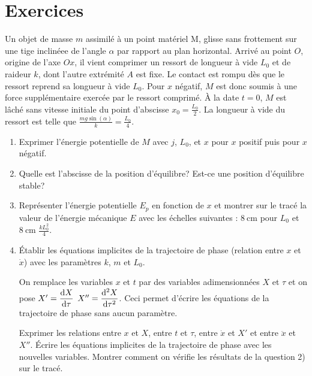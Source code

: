 \section{Exercices}%
\label{chap5-sec:exercices}%
\begin{exercice}%
  Un objet de masse \(m\) assimilé à un point matériel M, glisse sans 
  frottement sur une tige inclinéee de l'angle \(\alpha\) par rapport au plan 
  horizontal.
  Arrivé au point \(O\), origine de l'axe \(Ox\), il vient comprimer un ressort 
  de longueur à vide \(L_0\) et de raideur \(k\), dont l'autre extrémité \(A\) 
  est fixe. Le contact est rompu dès que le ressort reprend sa longueur à vide 
  \(L_0\). Pour \(x\) négatif, \(M\) est donc soumis à une force supplémentaire 
  exercée par le ressort comprimé.
  À la date \(t=0\), \(M\) est lâché sans vitesse initiale du point d'abscisse 
  \(x_0=\frac{L_0}{2}\). La longueur à vide du ressort est telle que \(\frac{mg 
  \sin(\alpha)}{k} = \frac{L_0}{4}\).
  \begin{enumerate}
    \item Exprimer l'énergie potentielle de \(M\) avec \(j\), \(L_0\), et \(x\) 
      pour \(x\) positif puis pour \(x\) négatif.
    \item Quelle est l'abscisse de la position d'équilibre? Est-ce une 
      position d'équilibre stable?
    \item Représenter l'énergie potentielle \(E_p\) en fonction de \(x\) et 
      montrer sur le tracé la valeur de l'énergie mécanique \(E\) avec les 
      échelles suivantes : \(\SI{8}{\centi\meter}\) pour \(L_0\) et 
      \(\SI{8}{\centi\meter}\) \(\frac{k L_0^2}{4}\).
    \item Établir les équations implicites de la trajectoire de phase (relation 
      entre \(x\) et \(\dot{x}\)) avec les paramètres \(k\), \(m\) et \(L_0\).

    On remplace les variables \(x\) et \(t\) par des variables adimensionnées 
      \(X\) et \(\tau\) et on pose \(X' = \dfrac{\mathrm{d} X}{\mathrm{d} \tau}\) \(X'' = 
      \dfrac{\mathrm{d}^2 X}{\mathrm{d} {\tau}^2}\). Ceci permet d'écrire les équations de la 
      trajectoire de phase sans aucun paramètre.

    Exprimer les relations entre \(x\) et \(X\), entre \(t\) et \(\tau\), entre 
      \(\dot{x}\) et \(X'\) et entre \(\ddot{x}\) et \(X''\).
    Écrire les équations implicites de la trajectoire de phase avec les 
      nouvelles variables. Montrer comment on vérifie les résultats de la 
      question 2) sur le tracé.
  \end{enumerate}
\end{exercice}%
